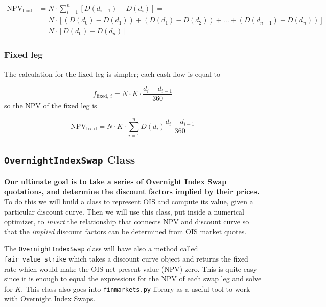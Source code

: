 \begin{equation}
  \begin{split}
    \mathrm{NPV}_{\mathrm{float}} & = N\cdot\sum_{i=1}^{n}[D(d_{i-1}) - D(d_i)] =  \\
    &= N\cdot[(D(d_{0}) - D(d_{1})) + (D(d_{1}) - D(d_{2})) + ... + (D(d_{n-1}) - D(d_{n}))]\\
    &= N \cdot [D(d_0) - D(d_n)]
  \end{split}
\end{equation}

\subsubsection{Fixed leg}\label{fixed-leg}

The calculation for the fixed leg is simpler; each cash flow is equal to

\begin{equation}
f_{\mathrm{fixed},~i}=N\cdot K\cdot \frac{d_i - d_{i-1}}{360}
\end{equation}
so the NPV of the fixed leg is

\begin{equation}
\mathrm{NPV}_{\mathrm{fixed}} = N\cdot K\cdot \sum_{i=1}^{n}D(d_{i})\frac{d_i - d_{i-1}}{360}
\end{equation}

\subsection{\texttt{OvernightIndexSwap} Class}\label{discount-factor-determination-from-market-quotes}

\textbf{Our ultimate goal is to take a series of Overnight Index Swap quotations, and determine the discount factors implied by their prices.} To do this we will build a class to represent OIS and compute its value, given a particular discount curve. Then we will use this class, put inside a numerical optimizer, to \emph{invert} the relationship that connects NPV and discount curve so that the \emph{implied} discount factors can be determined from OIS market quotes.

\begin{finmarkets}
The \texttt{OvernightIndexSwap} class will have also a method called \texttt{fair\_value\_strike} which takes a discount curve object and returns the fixed rate which would make the OIS net present value (NPV) zero. This is quite easy since it is enough to equal the expressions for the NPV of each swap leg and solve for $K$.
This class also goes into \texttt{finmarkets.py} library as a useful tool to work with Overnight Index Swaps.
\end{finmarkets}

